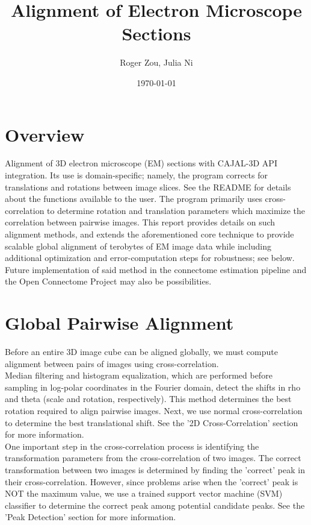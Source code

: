 \documentclass{article}
\author{Roger Zou, Julia Ni}
\date{\today}
\title{Alignment of Electron Microscope Sections}
\begin{document}
  
\maketitle

\section{Overview}
Alignment of 3D electron microscope (EM) sections with CAJAL-3D API integration. Its use is domain-specific; namely, the program corrects for translations and rotations between image slices. See the README for details about the functions available to the user. The program primarily uses cross-correlation to determine rotation and translation parameters which maximize the correlation between pairwise images. This report provides details on such alignment methods, and extends the aforementioned core technique to provide scalable global alignment of terobytes of EM image data while including additional optimization and error-computation steps for robustness; see below. Future implementation of said method in the connectome estimation pipeline and the Open Connectome Project may also be possibilities. 

\section{Global Pairwise Alignment}
Before an entire 3D image cube can be aligned globally, we must compute alignment between pairs of images using cross-correlation.
\\
Median filtering and histogram equalization, which are performed before sampling in log-polar coordinates in the Fourier domain, detect the shifts in rho and theta (scale and rotation, respectively). This method determines the best rotation required to align pairwise images. Next, we use normal cross-correlation to determine the best translational shift. See the '2D Cross-Correlation' section for more information.
\\
One important step in the cross-correlation process is identifying the transformation parameters from the cross-correlation of two images. The correct transformation between two images is determined by finding the 'correct' peak in their cross-correlation. However, since problems arise when the 'correct' peak is NOT the maximum value, we use a trained support vector machine (SVM) classifier to determine the correct peak among potential candidate peaks. See the 'Peak Detection' section for more information. 
\end{document}
